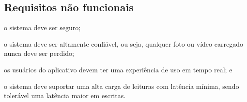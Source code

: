 \subsection{Requisitos não funcionais}

\begin{alineas}
	\item o sistema deve ser seguro;
	\item o sistema deve ser altamente confiável, ou seja, qualquer foto ou vídeo carregado nunca deve ser perdido;
	\item os usuários do aplicativo devem ter uma experiência de uso em tempo real; e
	\item o sistema deve suportar uma alta carga de leituras com latência mínima, sendo tolerável uma latência maior em escritas.
\end{alineas}
